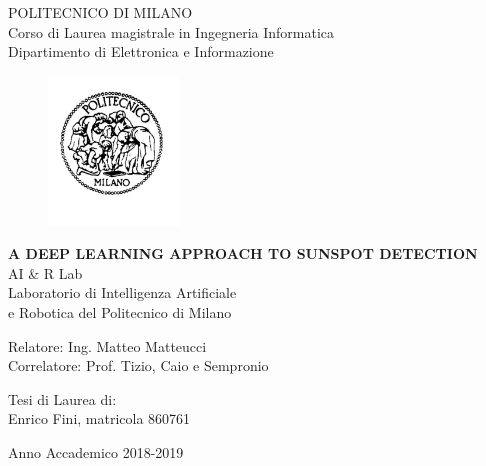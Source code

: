 \thispagestyle{empty}
\vspace*{-1.5cm} \bfseries{
\begin{center}
  \large
  POLITECNICO DI MILANO\\
  \normalsize
  Corso di Laurea magistrale in Ingegneria Informatica\\
  Dipartimento di Elettronica e Informazione\\
  \begin{figure}[htbp]
    \begin{center}
      \includegraphics[width=3.5cm]{./pictures/logopm}
    \end{center}
  \end{figure}
  \vspace*{0.3cm} \LARGE



  \textbf{A DEEP LEARNING APPROACH TO SUNSPOT DETECTION}\\



  \vspace*{.75truecm} \large
  AI \& R Lab \\
  Laboratorio di Intelligenza Artificiale \\
  e Robotica del Politecnico di Milano
\end{center}
\vspace*{3.0cm} \large
\begin{flushleft}


  Relatore: Ing. Matteo Matteucci \\
  Correlatore: Prof. Tizio, Caio e Sempronio

\end{flushleft}
\vspace*{1.0cm}
\begin{flushright}


  Tesi di Laurea di:\\ Enrico Fini, matricola 860761\\


\end{flushright}
\vspace*{1.0cm}
\begin{center}



  Anno Accademico 2018-2019
\end{center} \clearpage
}
